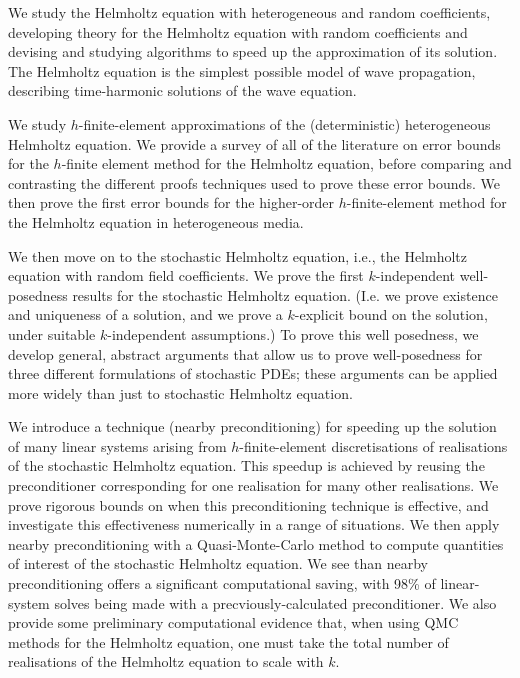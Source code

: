 We study the Helmholtz equation with heterogeneous and random coefficients, developing theory for the Helmholtz equation with random coefficients and devising and studying algorithms to speed up the approximation of its solution. The Helmholtz equation is the simplest possible model of wave propagation, describing time-harmonic solutions of the wave equation.

We study $h$-finite-element approximations of the (deterministic) heterogeneous Helmholtz equation. We provide a survey of all of the literature on error bounds for the $h$-finite element method for the Helmholtz equation, before comparing and contrasting the different proofs techniques used to prove these error bounds. We then prove the first error bounds for the higher-order $h$-finite-element method for the Helmholtz equation in heterogeneous media.

We then move on to the stochastic Helmholtz equation, i.e., the Helmholtz equation with random field coefficients. We prove the first $k$-independent well-posedness results for the stochastic Helmholtz equation. (I.e. we prove existence and uniqueness of a solution, and we prove a $k$-explicit bound on the solution, under suitable $k$-independent assumptions.) To prove this well posedness, we develop general, abstract arguments that allow us to prove well-posedness for three different formulations of stochastic PDEs; these arguments can be applied more widely than just to stochastic Helmholtz equation.

We introduce a technique (nearby preconditioning) for speeding up the solution of many linear systems arising from $h$-finite-element discretisations of realisations of the stochastic Helmholtz equation. This speedup is achieved by reusing the preconditioner corresponding for one realisation for many other realisations. We prove rigorous bounds on when this preconditioning technique is effective, and investigate this effectiveness numerically in a range of situations. We then apply nearby preconditioning with a Quasi-Monte-Carlo method to compute quantities of interest of the stochastic Helmholtz equation. We see than nearby preconditioning offers a significant computational saving, with 98\% of linear-system solves being made with a precviously-calculated preconditioner. We also provide some preliminary computational evidence that, when using QMC methods for the Helmholtz equation, one must take the total number of realisations of the Helmholtz equation to scale with $k.$
